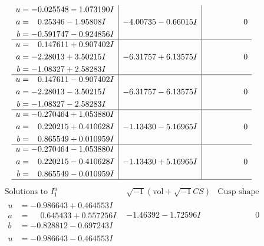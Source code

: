 \documentclass[1p]{elsarticle_modified}
\theoremstyle{definition}
\newcommand{\I}{\sqrt{-1}}
\begin{document}
$$\begin{array}{c|c|c}
\begin{aligned}
u &= -0.025548 - 1.073190 I \\
a &= \phantom{-}0.25346 - 1.95808 I \\
b &= -0.591747 - 0.924856 I\end{aligned}
 & -4.00735 - 0.66015 I & \phantom{-0.000000 } 0 \\ \hline\begin{aligned}
u &= \phantom{-}0.147611 + 0.907402 I \\
a &= -2.28013 + 3.50215 I \\
b &= -1.08327 + 2.58283 I\end{aligned}
 & -6.31757 + 6.13575 I & \phantom{-0.000000 } 0 \\ \hline\begin{aligned}
u &= \phantom{-}0.147611 - 0.907402 I \\
a &= -2.28013 - 3.50215 I \\
b &= -1.08327 - 2.58283 I\end{aligned}
 & -6.31757 - 6.13575 I & \phantom{-0.000000 } 0 \\ \hline\begin{aligned}
u &= -0.270464 + 1.053880 I \\
a &= \phantom{-}0.220215 + 0.410628 I \\
b &= \phantom{-}0.865549 + 0.010959 I\end{aligned}
 & -1.13430 - 5.16965 I & \phantom{-0.000000 } 0 \\ \hline\begin{aligned}
u &= -0.270464 - 1.053880 I \\
a &= \phantom{-}0.220215 - 0.410628 I \\
b &= \phantom{-}0.865549 - 0.010959 I\end{aligned}
 & -1.13430 + 5.16965 I & \phantom{-0.000000 } 0\\
 \hline 
 \end{array}$$\newpage$$\begin{array}{c|c|c}  
\text{Solutions to }I^u_{1}& \I (\text{vol} + \sqrt{-1}CS) & \text{Cusp shape}\\
 \hline 
\begin{aligned}
u &= -0.986643 + 0.464553 I \\
a &= \phantom{-}0.645433 + 0.557256 I \\
b &= -0.828812 - 0.697243 I\end{aligned}
 & -1.46392 - 1.72596 I & \phantom{-0.000000 } 0 \\ \hline\begin{aligned}
u &= -0.986643 - 0.464553 I \\

\end{aligned}
\end{array}$$
\end{document}
